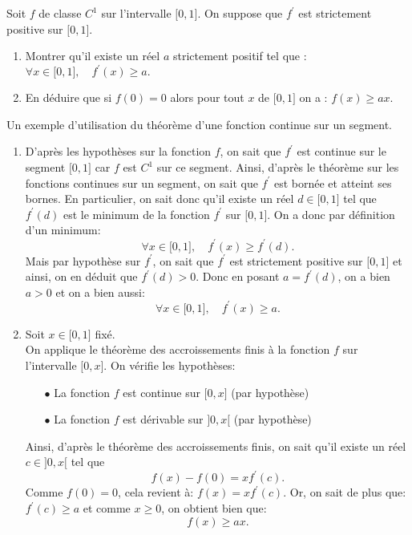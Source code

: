 \documentclass[a4paper, 11pt,reqno]{article}
\begin{document}
\begin{exercice}   \;
	Soit $f$ de classe $C^1$ sur l'intervalle $\lbrack 0,1\rbrack$. On suppose que $f^{\prime}$ est strictement positive sur $\lbrack 0,1\rbrack$.
	\begin{enumerate}
		\item Montrer qu'il existe un r\'eel $a$ strictement positif tel que : $\forall x\in\lbrack 0,1\rbrack,\quad f^{\prime}(x)\geq a.$
		\item En d\'eduire que si $f(0)=0$ alors pour tout $x$ de $\lbrack 0,1\rbrack$ on a : $f(x)\geq ax.$
	\end{enumerate}
\end{exercice}
\begin{correction}  \;
	Un exemple d'utilisation du th\'eor\`eme d'une fonction continue sur un segment.
	\begin{enumerate}
		\item D'apr\`es les hypoth\`eses sur la fonction $f$, on sait que $f^{\prime}$ est continue sur le segment $\lbrack 0,1\rbrack$ car $f$ est
		      $C^1$ sur ce segment. Ainsi, d'apr\`es le th\'eor\`eme sur les fonctions continues sur un segment, on sait que $f^{\prime}$ est born\'ee et atteint ses bornes. En particulier, on sait donc qu'il existe un r\'eel $d\in\lbrack 0,1\rbrack$ tel que $f^{\prime}(d)$ est le minimum de la fonction $f^{\prime}$ sur $\lbrack 0,1\rbrack$. On a donc par d\'efinition d'un minimum:
		      $$\forall x\in\lbrack 0,1\rbrack,\quad f^{\prime}(x)\geq f^{\prime}(d).$$
		      Mais par hypoth\`ese sur $f^{\prime}$, on sait que $f^{\prime}$ est strictement positive sur $\lbrack 0,1\rbrack$ et ainsi, on en d\'eduit que $f^{\prime}(d)>0$. Donc en posant $a=f^{\prime}(d)$, on a bien $a>0$ et on a bien aussi:
		      $$\forall x\in\lbrack 0,1\rbrack,\quad f^{\prime}(x)\geq a.$$
		\item Soit $x\in\lbrack 0,1\rbrack$ fix\'e.\\
		      \noindent On applique le th\'eor\`eme des accroissements finis \`a la fonction $f$ sur l'intervalle $\lbrack 0,x\rbrack$. On v\'erifie les hypoth\`eses:
		      \begin{itemize}
			      \item[$\bullet$] La fonction $f$ est continue sur $\lbrack 0,x\rbrack$ (par hypoth\`ese)
			      \item[$\bullet$] La fonction $f$ est d\'erivable sur $\rbrack 0,x\lbrack$ (par hypoth\`ese)
		      \end{itemize}
		      Ainsi, d'apr\`es le th\'eor\`eme des accroissements finis, on sait qu'il existe un r\'eel $c\in\rbrack 0,x\lbrack$ tel que
		      $$f(x)-f(0)=xf^{\prime}(c).$$
		      Comme $f(0)=0$, cela revient \`a: $f(x)=xf^{\prime}(c)$. Or, on sait de plus que: $f^{\prime}(c)\geq a$ et comme $x\geq 0$, on obtient bien que:
		      $$f(x)\geq ax.$$
	\end{enumerate}
\end{correction}
\end{document}
